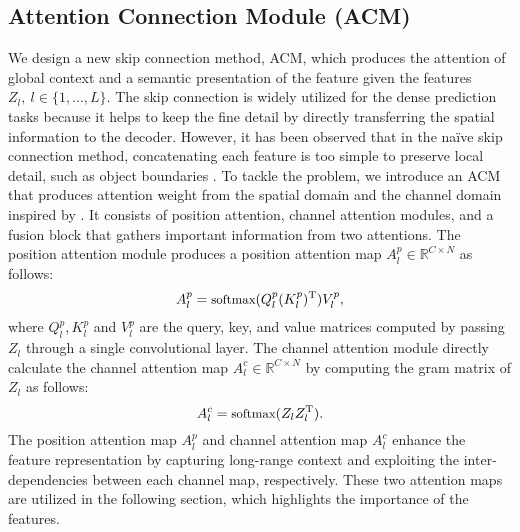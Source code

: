 \documentclass[letterpaper]{article} \usepackage{aaai23}  \usepackage{times}  \usepackage{helvet}  \usepackage{courier}  \usepackage[hyphens]{url}  \usepackage{graphicx} \urlstyle{rm} \def\UrlFont{\rm}  \usepackage{natbib}  \usepackage{caption} \frenchspacing  \setlength{\pdfpagewidth}{8.5in} \setlength{\pdfpageheight}{11in} \usepackage{algorithm}
\begin{document}
\subsection{Attention Connection Module (ACM)}
\label{sec:ACM}
We design a new skip connection method, ACM, which produces the attention of global context and a semantic presentation of the feature given the features $Z_{l},~l\in\{1,...,L\}$.
The skip connection is widely utilized for the dense prediction tasks \cite{ronneberger2015u} because it helps to keep the fine detail by directly transferring the spatial information to the decoder. 
However, it has been observed that in the na\"ive skip connection method, concatenating each feature is too simple to preserve local detail, such as object boundaries \cite{zhou2018unet++}.
To tackle the problem, we introduce an ACM that produces attention weight from the spatial domain and the channel domain inspired by \cite{fu2019dual}. 
It consists of position attention, channel attention modules, and a fusion block that gathers important information from two attentions.
The position attention module produces a position attention map $A^p_{l} \in \mathbb{R}^{C \times N}$ as follows:
\begin{equation}
\small
    A^p_{l} = \text{softmax}({Q}^p_{l} ({K}^p_{l})^\text{T})V^p_{l},
\end{equation}
where ${Q}^p_l, {K}^p_l$ and ${V}^p_l$ are the query, key, and value matrices computed by passing $Z_{l}$ through a single convolutional layer.
The channel attention module directly calculate the channel attention map $ A^c_l \in \mathbb{R}^{C \times N}$ by computing the gram matrix of $Z_l$ as follows: 
\begin{equation}
\small
    A^c_l = \text{softmax}(Z_lZ_l^{\text{T}}).
\end{equation}
The position attention map $A^p_l$ and channel attention map $A^c_l$ enhance the feature representation by capturing long-range context and exploiting the inter-dependencies between each channel map, respectively. 
These two attention maps are utilized in the following section, which highlights the importance of the features.
\end{document}

